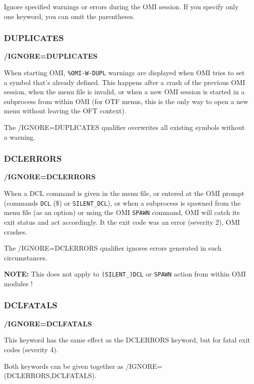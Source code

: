 \documentclass[a4paper]{book}
\newcommand{\vs}{\vspace{3mm}}
\renewcommand{\indent}{\hspace*{5mm}}
\begin{document}
Ignore specified warnings or errors during the OMI session.
If you specify only one keyword, you can omit the parentheses.

\subsubsection{DUPLICATES}
\indent\textbf{/IGNORE=DUPLICATES}

When starting OMI, \texttt{\%OMI-W-DUPL} warnings are displayed when OMI
tries to set a symbol that's already defined. This happens after
a crash of the previous OMI session, when the menu file is invalid,
or when a new OMI session is started in a subprocess from within OMI
(for OTF menus, this is the only way to open a new menu without
leaving the OFT context).

The /IGNORE=DUPLICATES qualifier overwrites all existing symbols
without a warning.
    
\subsubsection{DCLERRORS}
\indent\textbf{/IGNORE=DCLERRORS}

When a DCL command is given in the menu file, or entered at the OMI 
prompt (commands \texttt{DCL} (\$) or \texttt{SILENT\_DCL}), or when
a subprocess is spawned from the menu file (as an option) or using the
OMI \texttt{SPAWN} command, OMI will catch its exit status and act
accordingly. It the exit code was an error (severity 2), OMI crashes.

The /IGNORE=DCLERRORS qualifier ignores errors generated in such circumstances.

\vs

\textbf{NOTE:} This does not apply to \texttt{(SILENT\_)DCL} or \texttt{SPAWN} action from within OMI modules !
    
\subsubsection{DCLFATALS}
\indent\textbf{/IGNORE=DCLFATALS}


This keyword has the same effect as the DCLERRORS keyword, but for
fatal exit codes (severity 4).

Both keywords can be given together as /IGNORE=(DCLERRORS,DCLFATALS).
\end{document}
